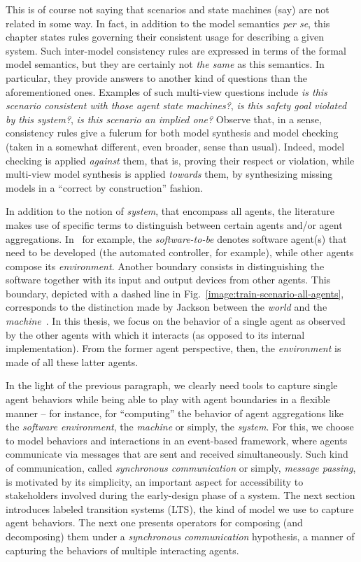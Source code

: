 This is of course not saying that scenarios and state machines (say) are not related in some way. In fact, in addition to the model semantics \emph{per se}, this chapter states rules governing their consistent usage for describing a given system. Such inter-model consistency rules are expressed in terms of the formal model semantics, but they are certainly not \emph{the same} as this semantics. In particular, they provide answers to another kind of questions than the aforementioned ones. Examples of such multi-view questions include \emph{is this scenario consistent with those agent state machines?}, \emph{is this safety goal violated by this system?}, \emph{is this scenario an implied one?} Observe that, in a sense, consistency rules give a fulcrum for both model synthesis and model checking (taken in a somewhat different, even broader, sense than usual). Indeed, model checking is applied \emph{against} them, that is, proving their respect or violation, while multi-view model synthesis is applied \emph{towards} them, by synthesizing missing models in a ``correct by construction'' fashion.


In addition to the notion of \emph{system}, that encompass all agents, the literature makes use of specific terms to distinguish between certain agents and/or agent aggregations. In~\cite{VanLamsweerde:2009} for example, the \emph{software-to-be} denotes software agent(s) that need to be developed (the automated controller, for example), while other agents compose its \emph{environment}. Another boundary consists in distinguishing the software together with its input and output devices from other agents. This boundary, depicted with a dashed line in Fig.~\ref{image:train-scenario-all-agents}, corresponds to the distinction made by Jackson between the \emph{world} and the \emph{machine}~\cite{Jackson:1995}. In this thesis, we focus on the behavior of a single agent as observed by the other agents with which it interacts (as opposed to its internal implementation). From the former agent perspective, then, the \emph{environment} is made of all these latter agents. 

In the light of the previous paragraph, we clearly need tools to capture single agent behaviors while being able to play with agent boundaries in a flexible manner -- for instance, for ``computing'' the behavior of agent aggregations like the \emph{software environment}, the \emph{machine} or simply, the \emph{system}. For this, we choose to model behaviors and interactions in an event-based framework, where agents communicate via messages that are sent and received simultaneously. Such kind of communication, called \emph{synchronous communication} or simply, \emph{message passing}, is motivated by its simplicity, an important aspect for accessibility to stakeholders involved during the early-design phase of a system. The next section introduces  labeled transition systems (LTS), the kind of model we use to capture agent behaviors. The next one presents operators for composing (and decomposing) them under a \emph{synchronous communication} hypothesis, a manner of capturing the behaviors of multiple interacting agents.


